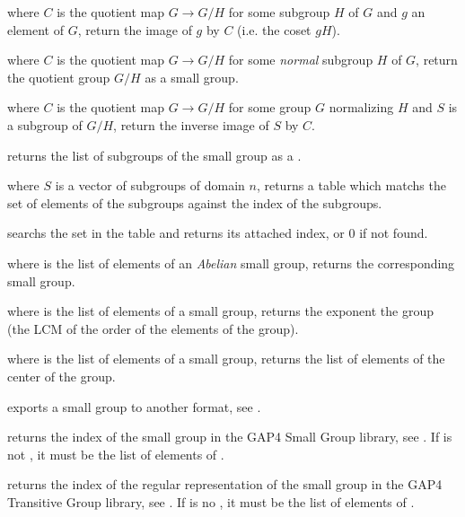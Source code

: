  where $C$ is the quotient map
$G\rightarrow G/H$ for some subgroup $H$ of $G$ and $g$ an element of $G$,
return the image of $g$ by $C$ (i.e. the coset $gH$).

 where $C$ is the quotient map
$G\rightarrow G/H$ for some \emph{normal} subgroup $H$ of $G$, return the
quotient group $G/H$ as a small group.

 where $C$ is the
quotient map $G\rightarrow G/H$ for some group $G$ normalizing $H$ and $S$ is
a subgroup of $G/H$, return the inverse image of $S$ by $C$.

 returns the list of subgroups of the
small group  as a .

 where $S$ is a vector of subgroups
of domain $n$, returns a table which matchs the set of elements of the
subgroups against the index of the subgroups.

 searchs the set  in
the table  and returns its attached index, or $0$ if not found.

 where  is the list of
elements of an \emph{Abelian} small group, returns the corresponding
small group.

 where  is the list of
elements of a small group, returns the exponent the group (the LCM of the order
of the elements of the group).

 where  is the list of elements
of a small group, returns the list of elements of the center of the
group.

 exports a small group
to another format, see .

 returns the index of the small group
 in the GAP4 Small Group library, see . If
 is not , it must be the list of elements of .

 returns the index of the
regular representation of the small group  in the GAP4 Transitive
Group library, see . If  is no , it must be
the list of elements of .

